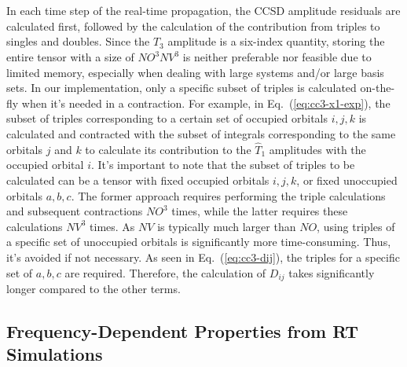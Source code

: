In each time step of the real-time propagation, the CCSD amplitude residuals are calculated first, followed by the calculation of the contribution from triples to singles and doubles. Since the $\hat{T}_{3}$ amplitude is a six-index quantity, storing the entire tensor with a size of $NO^{3}NV^{3}$ is neither preferable nor feasible due to limited memory, especially when dealing with large systems and/or large basis sets. In our implementation, only a specific subset of triples is calculated on-the-fly when it's needed in a contraction. For example, in Eq.~(\ref{eq:cc3-x1-exp}), the subset of triples corresponding to a certain set of occupied orbitals $i, j, k$ is calculated and contracted with the subset of integrals corresponding to the same orbitals $j$ and $k$ to calculate its contribution to the $\hat{T}_{1}$ amplitudes with the occupied orbital $i$. It's important to note that the subset of triples to be calculated can be a tensor with fixed occupied orbitals $i, j, k$, or fixed unoccupied orbitals $a, b, c$. The former approach requires performing the triple calculations and subsequent contractions $NO^{3}$ times, while the latter requires these calculations $NV^{3}$ times. As $NV$ is typically much larger than $NO$, using triples of a specific set of unoccupied orbitals is significantly more time-consuming. Thus, it's avoided if not necessary. As seen in Eq.~(\ref{eq:cc3-dij}), the triples for a specific set of $a,b,c$ are required. Therefore, the calculation of $D_{ij}$ takes significantly longer compared to the other terms.

\subsection{Frequency-Dependent Properties from RT Simulations} \label{theory-cc3-2}
